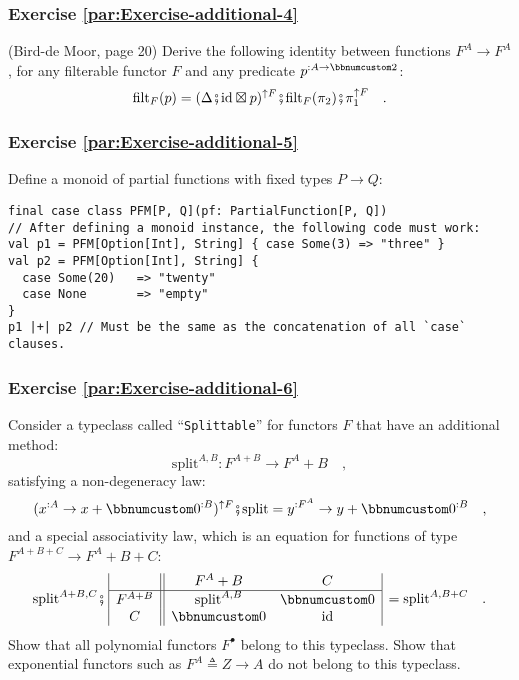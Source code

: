 \subsubsection{Exercise \label{par:Exercise-additional-4}\ref{par:Exercise-additional-4}}

(Bird-de Moor, page 20) Derive the following identity between functions
$F^{A}\rightarrow F^{A}$, for any filterable functor $F$ and any
predicate $p^{:A\rightarrow\bbnum 2}$: 
\[
\text{filt}_{F}(p)=(\Delta\bef\text{id}\boxtimes p)^{\uparrow F}\bef\text{filt}_{F}(\pi_{2})\bef\pi_{1}^{\uparrow F}\quad.
\]


\subsubsection{Exercise \label{par:Exercise-additional-5}\ref{par:Exercise-additional-5}}

Define a monoid of partial functions with fixed types $P\rightarrow Q$:
\begin{lstlisting}
final case class PFM[P, Q](pf: PartialFunction[P, Q])
// After defining a monoid instance, the following code must work:
val p1 = PFM[Option[Int], String] { case Some(3) => "three" }
val p2 = PFM[Option[Int], String] {
  case Some(20)   => "twenty"
  case None       => "empty"
}
p1 |+| p2 // Must be the same as the concatenation of all `case` clauses.
\end{lstlisting}


\subsubsection{Exercise \label{par:Exercise-additional-6}\ref{par:Exercise-additional-6}}

Consider a typeclass called \textsf{``}\lstinline!Splittable!\textsf{''} for functors
$F$ that have an additional method:
\[
\text{split}^{A,B}:F^{A+B}\rightarrow F^{A}+B\quad,
\]
satisfying a non-degeneracy
law:
\[
(x^{:A}\rightarrow x+\bbnum 0^{:B})^{\uparrow F}\bef\text{split}=y^{:F^{A}}\rightarrow y+\bbnum 0^{:B}\quad,
\]
and a special associativity law,
which is an equation for functions of type $F^{A+B+C}\rightarrow F^{A}+B+C$:
\[
\text{split}^{A+B,C}\bef\,\begin{array}{|c||cc|}
 & F^{A}+B & C\\
\hline F^{A+B} & \text{split}^{A,B} & \bbnum 0\\
C & \bbnum 0 & \text{id}
\end{array}\,=\text{split}^{A,B+C}\quad.
\]
Show that all polynomial functors $F^{\bullet}$ belong to this typeclass.
Show that exponential functors such as $F^{A}\triangleq Z\rightarrow A$
do not belong to this typeclass.

